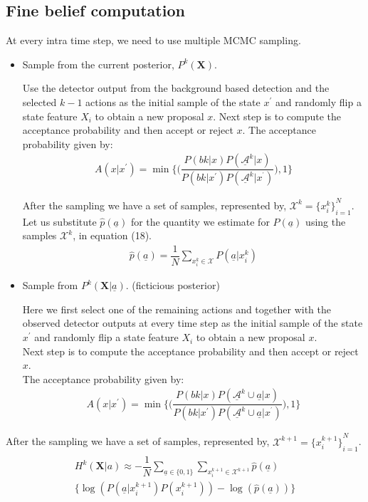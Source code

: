 \documentclass[10pt,twocolumn,letterpaper]{article}
\begin{document}
\subsection{Fine belief computation}
At every intra time step, we need to use multiple MCMC sampling.
\begin{itemize}
\item Sample from the current posterior, $P^{k}(\textbf{X})$.

Use the detector output from the background based detection and the selected $k-1$ actions as the initial sample of the state $x^{'} $ and randomly flip a state feature $X_{i}$ to obtain a new proposal $x $.
Next step is to compute the acceptance probability and then accept or reject $x$.
The acceptance probability given by:
\begin{align}
A(x|x^{'}) = \min\Big\lbrace\Big(\dfrac{P(bk|x)P(\underline{\mathcal{A}}^{k}|x)}{P(bk|x^{'})P(\underline{\mathcal{A}}^{k}|x^{^{'}})}\Big),1\Big\rbrace
\end{align}

After the sampling we have a set of samples, represented by,
 $\mathcal{X}^{k}={\lbrace x^{k}_{i}\rbrace}^{N}_{i=1}$.\\
Let us substitute $\widehat{p}( \underline{a})$ for the quantity we estimate for $P( \underline{a})$ using the samples $\mathcal{X}^{k}$, in equation (18).
\begin{align}
\widehat{p}( \underline{a}) = \dfrac{1}{N}\sum_{x^{k}_{i}\in \mathcal{X}}P( \underline{a}|x_{i}^{k})
\end{align}


\item Sample from $P^{k}(\textbf{X}|\underline{a})$. (ficticious posterior)

Here we first select one of the remaining actions and together with the observed detector outputs at every time step as the initial sample of the state $x^{'} $ and randomly flip a state feature $X_{i}$ to obtain a new proposal $x $.\\
Next step is to compute the acceptance probability and then accept or reject $x$.\\
The acceptance probability given by:
\begin{align}
A(x|x^{'}) = \min\Big\lbrace\Big(\dfrac{P(bk|x)P(\underline{\mathcal{A}}^{k}\cup \underline{a}|x)}{P(bk|x^{'})P(\underline{\mathcal{A}}^{k}\cup \underline{a}|x^{^{'}})}\Big),1\Big\rbrace
\end{align}
\end{itemize}
After the sampling we have a set of samples, represented by,
 $\mathcal{X}^{k+1}={\lbrace x^{k+1}_{i}\rbrace}^{N}_{i=1}$.
\begin{align}
\begin{split}
H^{k}(\textbf{X}| a)\approx -\dfrac{1}{N}\sum_{\underline{a}\in\lbrace 0 ,1 \rbrace} \sum_{x_{i}^{k+1}\in\mathcal{X}^{k+1}} \widehat{p}( \underline{a})\\ \Big\lbrace\log(P( \underline{a}|x^{k+1}_{i})P(x^{k+1}_{i})) - \log(\widehat{p}( \underline{a}))\Big\rbrace
\end{split}
\end{align}
\end{document}
